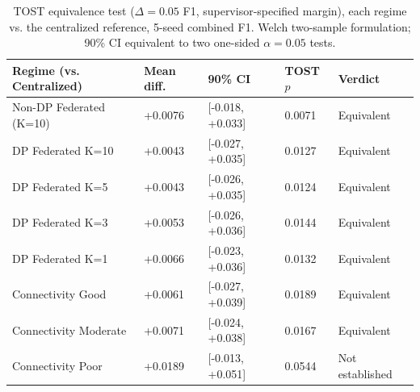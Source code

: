 \begin{table}[t]
\centering
\caption{TOST equivalence test ($\Delta=0.05$ F1, supervisor-specified margin), each regime vs. the centralized reference, 5-seed combined F1. Welch two-sample formulation; 90\% CI equivalent to two one-sided $\alpha=0.05$ tests.}
\label{tab:m3-equivalence-test}
\begin{tabular}{@{}lllll@{}}
\toprule
Regime (vs. Centralized) & Mean diff. & 90\% CI & TOST $p$ & Verdict \\
\midrule
Non-DP Federated (K=10) & +0.0076 & [-0.018, +0.033] & 0.0071 & Equivalent \\
DP Federated K=10 & +0.0043 & [-0.027, +0.035] & 0.0127 & Equivalent \\
DP Federated K=5 & +0.0043 & [-0.026, +0.035] & 0.0124 & Equivalent \\
DP Federated K=3 & +0.0053 & [-0.026, +0.036] & 0.0144 & Equivalent \\
DP Federated K=1 & +0.0066 & [-0.023, +0.036] & 0.0132 & Equivalent \\
Connectivity Good & +0.0061 & [-0.027, +0.039] & 0.0189 & Equivalent \\
Connectivity Moderate & +0.0071 & [-0.024, +0.038] & 0.0167 & Equivalent \\
Connectivity Poor & +0.0189 & [-0.013, +0.051] & 0.0544 & Not established \\
\bottomrule
\end{tabular}
\end{table}
